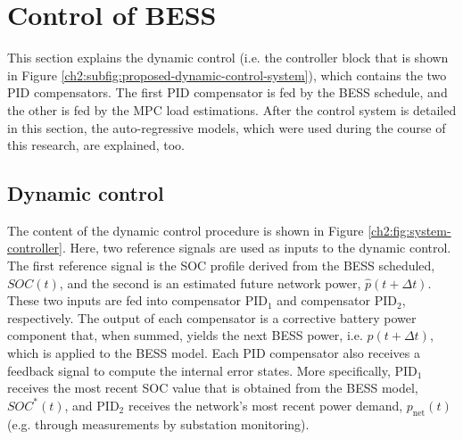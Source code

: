 \section{Control of BESS}
\label{ch2:sec:control-of-bess}



This section explains the dynamic control (i.e. the controller block that is shown in Figure \ref{ch2:subfig:proposed-dynamic-control-system}), which contains the two PID compensators.
The first PID compensator is fed by the BESS schedule, and the other is fed by the MPC load estimations.
After the control system is detailed in this section, the auto-regressive models, which were used during the course of this research, are explained, too.

\subsection{Dynamic control}

The content of the dynamic control procedure is shown in Figure \ref{ch2:fig:system-controller}.
Here, two reference signals are used as inputs to the dynamic control.
The first reference signal is the SOC profile derived from the BESS scheduled, $SOC(t)$, and the second is an estimated future network power, $\hat{p}(t+\Delta t)$.
These two inputs are fed into compensator PID$_1$ and compensator PID$_2$, respectively.
The output of each compensator is a corrective battery power component that, when summed, yields the next BESS power, i.e. $p(t+\Delta t)$, which is applied to the BESS model.
Each PID compensator also receives a feedback signal to compute the internal error states.
More specifically, PID$_1$ receives the most recent SOC value that is obtained from the BESS model, $SOC^*(t)$, and PID$_2$ receives the network's most recent power demand, $p_\text{net}(t)$ (e.g. through measurements by substation monitoring).


